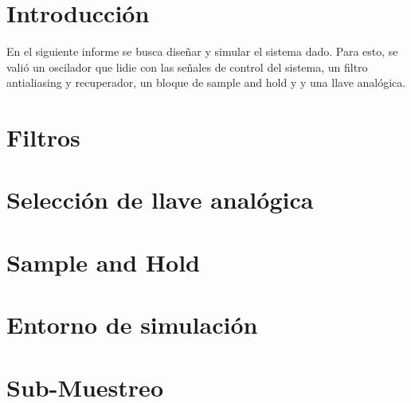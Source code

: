 







\tableofcontents
\newpage


\section{Introducción}

En el siguiente informe se busca diseñar y simular el sistema dado. Para esto, se valió un oscilador que lidie con las señales de control del sistema, un filtro antialiasing y recuperador, un bloque de sample and hold y y una llave analógica.

\section{Filtros}
	\label{Ejercicio-2}
	

\pagebreak
\section{Selección de llave analógica}
	\label{Ejercicio-3}
	

\pagebreak	
\section{Sample and Hold}
	\label{Ejercicio-4}
	
	


\pagebreak

\section{Entorno de simulación}
	\label{Ejercicio-5}
	
	
\pagebreak	
\section{Sub-Muestreo}
	\label{Ejercicio-8}
	
	
